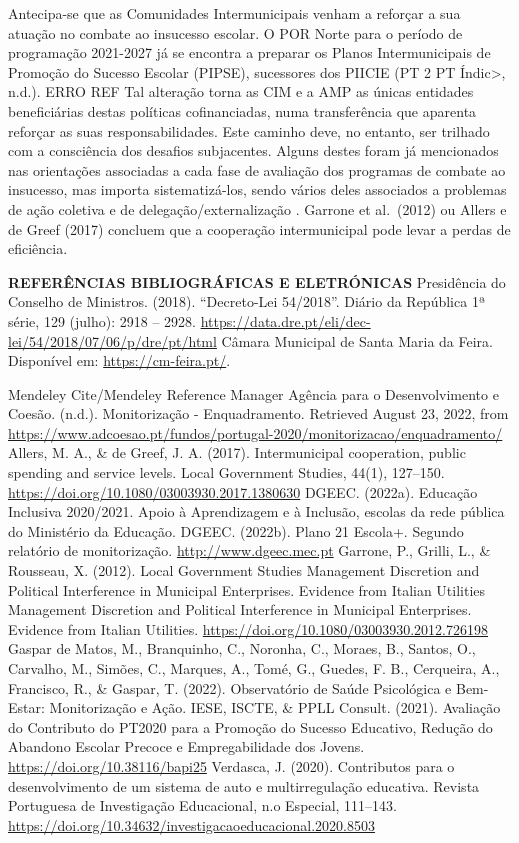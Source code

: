 \documentclass[
]{book}
\begin{document}
Antecipa-se que as Comunidades Intermunicipais venham a reforçar a sua atuação no combate ao insucesso escolar. O POR Norte para o período de programação 2021-2027 já se encontra a preparar os Planos Intermunicipais de Promoção do Sucesso Escolar (PIPSE), sucessores dos PIICIE (PT 2 PT Índic\textgreater, n.d.). ERRO REF Tal alteração torna as CIM e a AMP as únicas entidades beneficiárias destas políticas cofinanciadas, numa transferência que aparenta reforçar as suas responsabilidades. Este caminho deve, no entanto, ser trilhado com a consciência dos desafios subjacentes. Alguns destes foram já mencionados nas orientações associadas a cada fase de avaliação dos programas de combate ao insucesso, mas importa sistematizá-los, sendo vários deles associados a problemas de ação coletiva e de delegação/externalização . Garrone et al.~(2012) ou Allers e de Greef (2017) concluem que a cooperação intermunicipal pode levar a perdas de eficiência.

\textbf{REFERÊNCIAS BIBLIOGRÁFICAS E ELETRÓNICAS}
Presidência do Conselho de Ministros. (2018). ``Decreto-Lei 54/2018''. Diário da República 1ª série, 129 (julho): 2918 -- 2928. \url{https://data.dre.pt/eli/dec-lei/54/2018/07/06/p/dre/pt/html}
Câmara Municipal de Santa Maria da Feira. Disponível em: \url{https://cm-feira.pt/}.

Mendeley Cite/Mendeley Reference Manager
Agência para o Desenvolvimento e Coesão. (n.d.). Monitorização - Enquadramento. Retrieved August 23, 2022, from \url{https://www.adcoesao.pt/fundos/portugal-2020/monitorizacao/enquadramento/}
Allers, M. A., \& de Greef, J. A. (2017). Intermunicipal cooperation, public spending and service levels. Local Government Studies, 44(1), 127--150. \url{https://doi.org/10.1080/03003930.2017.1380630}
DGEEC. (2022a). Educação Inclusiva 2020/2021. Apoio à Aprendizagem e à Inclusão, escolas da rede pública do Ministério da Educação.
DGEEC. (2022b). Plano 21 Escola+. Segundo relatório de monitorização. \url{http://www.dgeec.mec.pt}
Garrone, P., Grilli, L., \& Rousseau, X. (2012). Local Government Studies Management Discretion and Political Interference in Municipal Enterprises. Evidence from Italian Utilities Management Discretion and Political Interference in Municipal Enterprises. Evidence from Italian Utilities. \url{https://doi.org/10.1080/03003930.2012.726198}
Gaspar de Matos, M., Branquinho, C., Noronha, C., Moraes, B., Santos, O., Carvalho, M., Simões, C., Marques, A., Tomé, G., Guedes, F. B., Cerqueira, A., Francisco, R., \& Gaspar, T. (2022). Observatório de Saúde Psicológica e Bem-Estar: Monitorização e Ação.
IESE, ISCTE, \& PPLL Consult. (2021). Avaliação do Contributo do PT2020 para a Promoção do Sucesso Educativo, Redução do Abandono Escolar Precoce e Empregabilidade dos Jovens. \url{https://doi.org/10.38116/bapi25}
Verdasca, J. (2020). Contributos para o desenvolvimento de um sistema de auto e multirregulação educativa. Revista Portuguesa de Investigação Educacional, n.o Especial, 111--143. \url{https://doi.org/10.34632/investigacaoeducacional.2020.8503}
\end{document}

